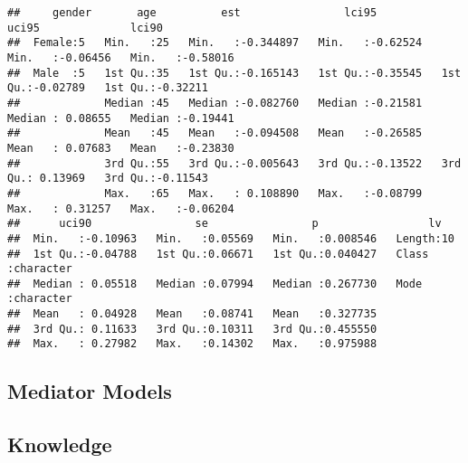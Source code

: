 \documentclass[
]{article}
\begin{document}
\begin{verbatim}
##     gender       age          est                lci95              uci95              lci90         
##  Female:5   Min.   :25   Min.   :-0.344897   Min.   :-0.62524   Min.   :-0.06456   Min.   :-0.58016  
##  Male  :5   1st Qu.:35   1st Qu.:-0.165143   1st Qu.:-0.35545   1st Qu.:-0.02789   1st Qu.:-0.32211  
##             Median :45   Median :-0.082760   Median :-0.21581   Median : 0.08655   Median :-0.19441  
##             Mean   :45   Mean   :-0.094508   Mean   :-0.26585   Mean   : 0.07683   Mean   :-0.23830  
##             3rd Qu.:55   3rd Qu.:-0.005643   3rd Qu.:-0.13522   3rd Qu.: 0.13969   3rd Qu.:-0.11543  
##             Max.   :65   Max.   : 0.108890   Max.   :-0.08799   Max.   : 0.31257   Max.   :-0.06204  
##      uci90                se                p                 lv           
##  Min.   :-0.10963   Min.   :0.05569   Min.   :0.008546   Length:10         
##  1st Qu.:-0.04788   1st Qu.:0.06671   1st Qu.:0.040427   Class :character  
##  Median : 0.05518   Median :0.07994   Median :0.267730   Mode  :character  
##  Mean   : 0.04928   Mean   :0.08741   Mean   :0.327735                     
##  3rd Qu.: 0.11633   3rd Qu.:0.10311   3rd Qu.:0.455550                     
##  Max.   : 0.27982   Max.   :0.14302   Max.   :0.975988
\end{verbatim}

\hypertarget{mediator-models-1}{%
\subsection{Mediator Models}\label{mediator-models-1}}

\hypertarget{knowledge-1}{%
\subsection{Knowledge}\label{knowledge-1}}
\end{document}
